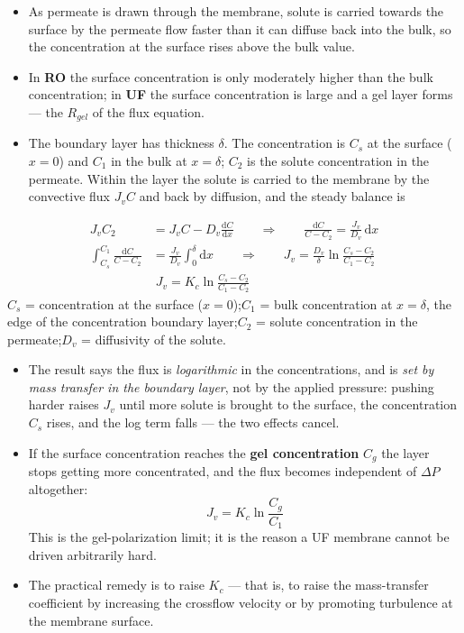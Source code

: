 \documentclass[10pt,a4paper]{article}
\newcommand{\spsub}[1]{\par\addvspace{7pt}\noindent{\color{accent}\bfseries #1}\par\addvspace{3pt}\nopagebreak}
\begin{document}
\spsub{Concentration polarization}
\begin{itemize}
  \item As permeate is drawn through the membrane, solute is carried towards the surface by the permeate flow faster than it can diffuse back into the bulk, so the concentration at the surface rises above the bulk value.
  \item In \textbf{RO} the surface concentration is only moderately higher than the bulk concentration; in \textbf{UF} the surface concentration is large and a gel layer forms --- the $R_{gel}$ of the flux equation.
  \item The boundary layer has thickness $\delta$. The concentration is $C_s$ at the surface ($x=0$) and $C_1$ in the bulk at $x=\delta$; $C_2$ is the solute concentration in the permeate. Within the layer the solute is carried to the membrane by the convective flux $J_vC$ and back by diffusion, and the steady balance is
\end{itemize}
\begin{formulabox}
\begin{align*}
J_vC_2 &= J_vC-D_v\frac{\mathrm{d}C}{\mathrm{d}x}
 \qquad\Longrightarrow\qquad
 \frac{\mathrm{d}C}{C-C_2}=\frac{J_v}{D_v}\,\mathrm{d}x\\[3pt]
\int_{C_s}^{C_1}\frac{\mathrm{d}C}{C-C_2}
 &=\frac{J_v}{D_v}\int_{0}^{\delta}\mathrm{d}x
 \qquad\Longrightarrow\qquad
 J_v=\frac{D_v}{\delta}\ln\frac{C_s-C_2}{C_1-C_2}\\[3pt]
&\boxed{\;J_v=K_c\ln\frac{C_s-C_2}{C_1-C_2}\;}
\end{align*}
\vspace{2pt}
{\small $C_s$ = concentration at the surface ($x=0$);\quad $C_1$ = bulk concentration at $x=\delta$, the edge of the concentration boundary layer;\quad $C_2$ = solute concentration in the permeate;\quad $D_v$ = diffusivity of the solute.}
\end{formulabox}
\begin{itemize}
  \item The result says the flux is \emph{logarithmic} in the concentrations, and is \emph{set by mass transfer in the boundary layer}, not by the applied pressure: pushing harder raises $J_v$ until more solute is brought to the surface, the concentration $C_s$ rises, and the log term falls --- the two effects cancel.
  \item If the surface concentration reaches the \textbf{gel concentration} $C_g$ the layer stops getting more concentrated, and the flux becomes independent of $\Delta P$ altogether:
  \[J_v=K_c\ln\frac{C_g}{C_1}\]
  This is the gel-polarization limit; it is the reason a UF membrane cannot be driven arbitrarily hard.
  \item The practical remedy is to raise $K_c$ --- that is, to raise the mass-transfer coefficient by increasing the crossflow velocity or by promoting turbulence at the membrane surface.
\end{itemize}
\end{document}
